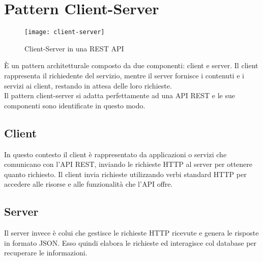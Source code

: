 \section{Pattern Client-Server}
\begin{figure}[H] 
    \centering 
    \texttt{[image: client-server]} 
    \caption{Client-Server in una REST API}
\end{figure}
È un pattern architetturale composto da due componenti: client e server. Il client rappresenta il richiedente del servizio, mentre il server fornisce i contenuti e i servizi ai client, restando in attesa delle loro richieste.\\
Il pattern client-server si adatta perfettamente ad una API REST e le sue componenti sono identificate in questo modo.
\subsection*{Client}
In questo contesto il client è rappresentato da applicazioni o servizi che comunicano con l'API REST, inviando le richieste HTTP al server per ottenere quanto richiesto. Il client invia richieste utilizzando verbi standard HTTP per accedere alle risorse e alle funzionalità che l'API offre.
\subsection*{Server} 
Il server invece è colui che gestisce le richieste HTTP ricevute e genera le risposte in formato JSON. Esso quindi elabora le richieste ed interagisce col database per recuperare le informazioni.\\
